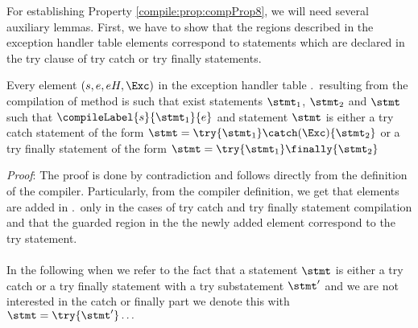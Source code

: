 For establishing Property \ref{compile:prop:compProp8}, we will need several auxiliary lemmas. First, we have to show that the regions described in the exception  handler table elements  
correspond to statements which are declared in the try clause of try catch or try finally statements.  
 \begin{compPropApp}\label{compile:prop:compProp7}
    Every element  $ (s,e, eH, \Exc )$  in the exception handler table \methodd.\excHandlerTable  \
    resulting from the compilation of method \methodd{}
    is such that exist statements $\stmt_1$, $\stmt_2$  and $\stmt$  such that $\compileLabel{s}{\stmt_1}{e}$
    and  statement $\stmt$ is either a try catch statement of the form 
    $\stmt = \try \{ \stmt_1 \} \catch ( \Exc )  \{ \stmt_2 \} $ or a try finally statement of the form 
    $\stmt = \try \{ \stmt_1 \} \finally \{ \stmt_2 \} $
\end{compPropApp} 
\textit{Proof}:
The proof is done by contradiction and follows directly from the definition of the compiler. 
 Particularly, from the compiler definition, we get that  elements are added in 
 \methodd.\excHandlerTable \ only in the cases of 
try catch and try finally statement compilation and that the guarded region in the  the newly added element
 correspond to the try  statement. \\
\Qed\\
In the following when we refer to the fact that a statement  $\stmt$  is either a try catch or a try finally statement with 
a try substatement $\stmt'$ and we 
are not interested in the catch or  finally  part we denote this with  $\stmt = \try{\stmt'} \ldots$





